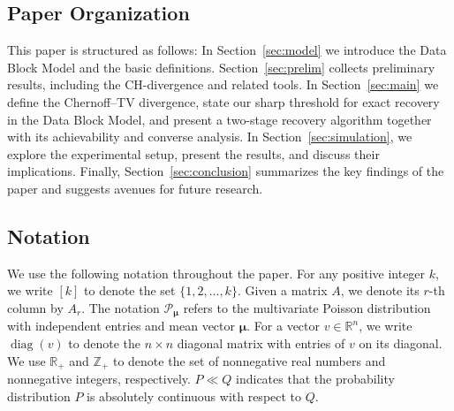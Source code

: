 \documentclass[11pt]{article}
\theoremstyle{plain}
\theoremstyle{definition}
\DeclareMathOperator{\diag}{diag}
\begin{document}
\subsection{Paper Organization}
This paper is structured as follows: In Section~\ref{sec:model} we introduce the Data Block Model and the basic definitions. Section~\ref{sec:prelim} collects preliminary results, including the CH-divergence and related tools. In Section~\ref{sec:main} we define the Chernoff--TV divergence, state our sharp threshold for exact recovery in the Data Block Model, and present a two-stage recovery algorithm together with its achievability and converse analysis. In Section~\ref{sec:simulation}, we explore the experimental setup, present the results, and discuss their implications. Finally, Section~\ref{sec:conclusion} summarizes the key findings of the paper and suggests avenues for future research.
\subsection{Notation} 
We use the following notation throughout the paper. For any positive integer $k$, we write $[k]$ to denote the set $\{1, 2, \ldots, k\}$. Given a matrix $A$, we denote its $r$-th column by $A_r$. The notation $\mathcal{P}_{\bm{\mu}}$ refers to the multivariate Poisson distribution with independent entries and mean vector $\bm{\mu}$. For a vector $v \in \mathbb{R}^n$, we write $\diag(v)$ to denote the $n \times n$ diagonal matrix with entries of $v$ on its diagonal. We use $\mathbb{R}_+$ and $\mathbb{Z}_+$ to denote the set of nonnegative real numbers and nonnegative integers, respectively. $P\ll Q$ indicates that the probability distribution $P$ is absolutely continuous with respect to $Q$.
\end{document}
